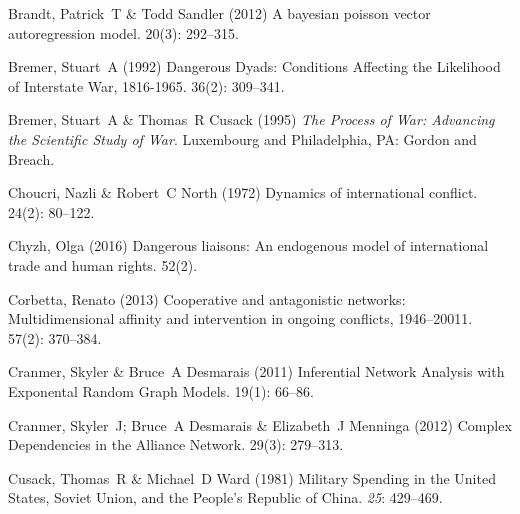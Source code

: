 \documentclass[3p,times,twocolumn,authoryear,12pt]{elsarticle}
\begin{document}
\begin{thebibliography}{}
Brandt, Patrick~T  \& Todd Sandler (2012) A bayesian poisson vector
  autoregression model.
 { 20\/}(3): 292--315.

Bremer, Stuart~A (1992) {Dangerous Dyads: Conditions Affecting the Likelihood
  of Interstate War, 1816-1965}.
 { 36\/}(2): 309--341.

Bremer, Stuart~A  \& Thomas~R Cusack (1995) {\em The Process of War: Advancing
  the Scientific Study of War}.
\newblock Luxembourg and Philadelphia, PA: Gordon and Breach.

Choucri, Nazli  \& Robert~C North (1972) Dynamics of international conflict.
 { 24\/}(2): 80--122.

Chyzh, Olga (2016) Dangerous liaisons: An endogenous model of international
  trade and human rights.
 { 52\/}(2).

Corbetta, Renato (2013) Cooperative and antagonistic networks: Multidimensional
  affinity and intervention in ongoing conflicts, 1946--20011.
 { 57\/}(2): 370--384.

Cranmer, Skyler  \& Bruce~A Desmarais (2011) {Inferential Network Analysis with
  Exponental Random Graph Models}.
 { 19\/}(1): 66--86.

Cranmer, Skyler~J; Bruce~A Desmarais  \& Elizabeth~J Menninga (2012) {Complex
  Dependencies in the Alliance Network}.
 { 29\/}(3): 279--313.

Cusack, Thomas~R  \& Michael~D Ward (1981) {Military Spending in the {U}nited
  {S}tates, {S}oviet {U}nion, and the {P}eople's {R}epublic of {C}hina}.
 {\em 25}: 429--469.


\end{thebibliography}
\end{document}
